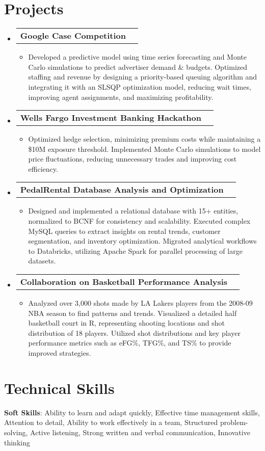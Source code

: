 \documentclass[letterpaper,11pt]{article}
\makeatletter
\newcommand{\resumeItem}[1]{
  \item\small{
    {#1 \vspace{-2pt}}
  }
}
\newcommand{\resumeProjectHeading}[2]{
    \item
    \begin{tabular*}{0.97\textwidth}{l@{\extracolsep{\fill}}r}
      \small#1 & #2 \\
    \end{tabular*}\vspace{-7pt}
}
\newcommand{\resumeSubHeadingListStart}{\begin{itemize}[leftmargin=0.15in, label={}]}
\newcommand{\resumeSubHeadingListEnd}{\end{itemize}}
\newcommand{\resumeItemListStart}{\begin{itemize}}
\newcommand{\resumeItemListEnd}{\end{itemize}\vspace{-5pt}}
\makeatother
\begin{document}
\section{Projects}
    \resumeSubHeadingListStart
      \resumeProjectHeading
          {\textbf{Google Case Competition}}{}
          \resumeItemListStart
            \resumeItem{Developed a predictive model using time series forecasting and Monte Carlo simulations to predict advertiser demand \& budgets. Optimized staffing and revenue by designing a priority-based queuing algorithm and integrating it with an SLSQP optimization model, reducing wait times, improving agent assignments, and maximizing profitability.}
          \resumeItemListEnd
      \resumeProjectHeading
          {\textbf{Wells Fargo Investment Banking Hackathon}}{}
          \resumeItemListStart
            \resumeItem{Optimized hedge selection, minimizing premium costs while maintaining a \$10M exposure threshold. Implemented Monte Carlo simulations to model price fluctuations, reducing unnecessary trades and improving cost efficiency.}
          \resumeItemListEnd
      \resumeProjectHeading
          {\textbf{PedalRental Database Analysis and Optimization}}{}
          \resumeItemListStart
            \resumeItem{Designed and implemented a relational database with 15+ entities, normalized to BCNF for consistency and scalability. Executed complex MySQL queries to extract insights on rental trends, customer segmentation, and inventory optimization. Migrated analytical workflows to Databricks, utilizing Apache Spark for parallel processing of large datasets.}
          \resumeItemListEnd
      \resumeProjectHeading
          {\textbf{Collaboration on Basketball Performance Analysis}}{}
          \resumeItemListStart
            \resumeItem{Analyzed over 3,000 shots made by LA Lakers players from the 2008-09 NBA season to find patterns and trends. Visualized a detailed half basketball court in R, representing shooting locations and shot distribution of 18 players. Utilized shot distributions and key player performance metrics such as eFG\%, TFG\%, and TS\% to provide improved strategies.}
          \resumeItemListEnd
    \resumeSubHeadingListEnd

\section{Technical Skills}
 \begin{itemize}[leftmargin=0.15in, label={}]
    \small{\item{
     \textbf{Soft Skills}{: Ability to learn and adapt quickly, Effective time management skills, Attention to detail, Ability to work effectively in a team, Structured problem-solving, Active listening, Strong written and verbal communication, Innovative thinking}
    }}
 \end{itemize}
\end{document}
